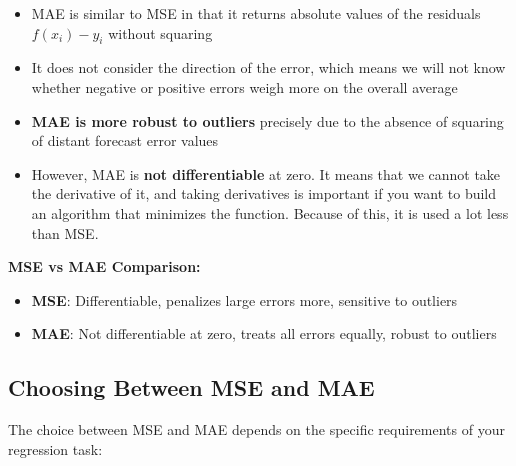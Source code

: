 \documentclass[11pt,a4paper]{article}
\theoremstyle{definition}
\theoremstyle{plain}
\theoremstyle{remark}
\begin{document}
\begin{itemize}
    \item MAE is similar to MSE in that it returns absolute values of the residuals $f(x_i) - y_i$ without squaring
    
    \item It does not consider the direction of the error, which means we will not know whether negative or positive errors weigh more on the overall average
    
    \item \textbf{MAE is more robust to outliers} precisely due to the absence of squaring of distant forecast error values
    
    \item However, MAE is \textbf{not differentiable} at zero. It means that we cannot take the derivative of it, and taking derivatives is important if you want to build an algorithm that minimizes the function. Because of this, it is used a lot less than MSE.
\end{itemize}

\begin{center}
\colorbox{cyan!10}{\parbox{0.9\textwidth}{
\textbf{MSE vs MAE Comparison:}
\begin{itemize}
    \item \textbf{MSE}: Differentiable, penalizes large errors more, sensitive to outliers
    \item \textbf{MAE}: Not differentiable at zero, treats all errors equally, robust to outliers
\end{itemize}
}}
\end{center}

\subsection{Choosing Between MSE and MAE}

The choice between MSE and MAE depends on the specific requirements of your regression task:
\end{document}

